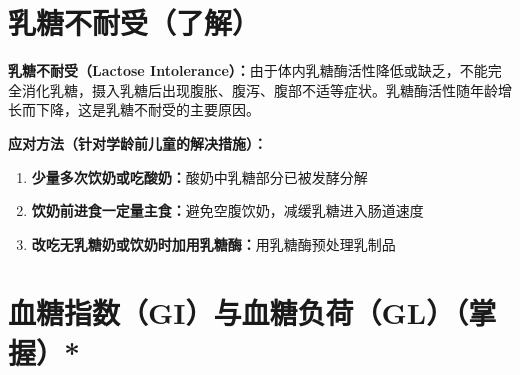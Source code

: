 \section{乳糖不耐受（了解）}

\begin{tipbox}
\textbf{乳糖不耐受（Lactose Intolerance）：}由于体内乳糖酶活性降低或缺乏，不能完全消化乳糖，摄入乳糖后出现腹胀、腹泻、腹部不适等症状。乳糖酶活性随年龄增长而下降，这是乳糖不耐受的主要原因。

\textbf{应对方法（针对学龄前儿童的解决措施）：}
\begin{enumerate}[leftmargin=*]
    \item \textbf{少量多次饮奶或吃酸奶：}酸奶中乳糖部分已被发酵分解
    \item \textbf{饮奶前进食一定量主食：}避免空腹饮奶，减缓乳糖进入肠道速度
    \item \textbf{改吃无乳糖奶或饮奶时加用乳糖酶：}用乳糖酶预处理乳制品
\end{enumerate}
\end{tipbox}

\section{血糖指数（GI）与血糖负荷（GL）（掌握）*}


